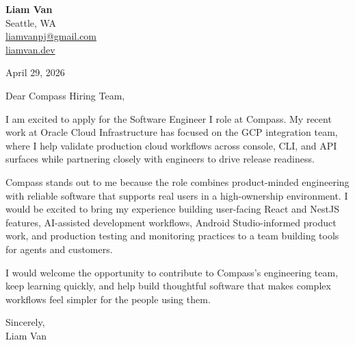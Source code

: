\documentclass[letterpaper,11pt]{article}
\begin{document}
\begin{flushleft}
\textbf{\Large Liam Van} \\
Seattle, WA \\
\href{mailto:liamvanpj@gmail.com}{liamvanpj@gmail.com} \\
\href{https://liamvan.dev}{liamvan.dev}
\end{flushleft}

April 29, 2026

\noindent Dear Compass Hiring Team,

\noindent I am excited to apply for the Software Engineer I role at Compass. My recent work at Oracle Cloud Infrastructure has focused on the GCP integration team, where I help validate production cloud workflows across console, CLI, and API surfaces while partnering closely with engineers to drive release readiness.

\noindent Compass stands out to me because the role combines product-minded engineering with reliable software that supports real users in a high-ownership environment. I would be excited to bring my experience building user-facing React and NestJS features, AI-assisted development workflows, Android Studio-informed product work, and production testing and monitoring practices to a team building tools for agents and customers.

\noindent I would welcome the opportunity to contribute to Compass's engineering team, keep learning quickly, and help build thoughtful software that makes complex workflows feel simpler for the people using them.

\noindent Sincerely, \\
Liam Van
\end{document}
